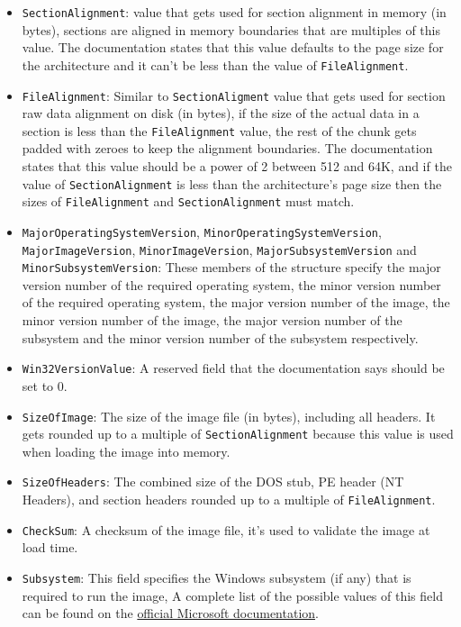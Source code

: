\begin{itemize}
    \item \verb+SectionAlignment+: value that gets used for section alignment in memory (in bytes), sections are aligned in memory boundaries that are multiples of this value. The documentation states that this value defaults to the page size for the architecture and it can’t be less than the value of \verb+FileAlignment+.
    \item \verb+FileAlignment+: Similar to \verb+SectionAligment+ value that gets used for section raw data alignment on disk (in bytes), if the size of the actual data in a section is less than the \verb+FileAlignment+ value, the rest of the chunk gets padded with zeroes to keep the alignment boundaries. The documentation states that this value should be a power of 2 between 512 and 64K, and if the value of \verb+SectionAlignment+ is less than the architecture’s page size then the sizes of \verb+FileAlignment+ and \verb+SectionAlignment+ must match.
    \item \verb+MajorOperatingSystemVersion+, \verb+MinorOperatingSystemVersion+, \verb+MajorImageVersion+, \verb+MinorImageVersion+, \verb+MajorSubsystemVersion+ and \verb+MinorSubsystemVersion+: These members of the structure specify the major version number of the required operating system, the minor version number of the required operating system, the major version number of the image, the minor version number of the image, the major version number of the subsystem and the minor version number of the subsystem respectively.
    \item \verb+Win32VersionValue+: A reserved field that the documentation says should be set to 0.
    \item \verb+SizeOfImage+: The size of the image file (in bytes), including all headers. It gets rounded up to a multiple of \verb+SectionAlignment+ because this value is used when loading the image into memory.
    \item \verb+SizeOfHeaders+: The combined size of the DOS stub, PE header (NT Headers), and section headers rounded up to a multiple of \verb+FileAlignment+.
    \item \verb+CheckSum+: A checksum of the image file, it’s used to validate the image at load time.
    \item \verb+Subsystem+: This field specifies the Windows subsystem (if any) that is required to run the image, A complete list of the possible values of this field can be found on the \href{https://learn.microsoft.com/en-us/windows/win32/debug/pe-format#windows-subsystem}{official Microsoft documentation}.

\end{itemize}
